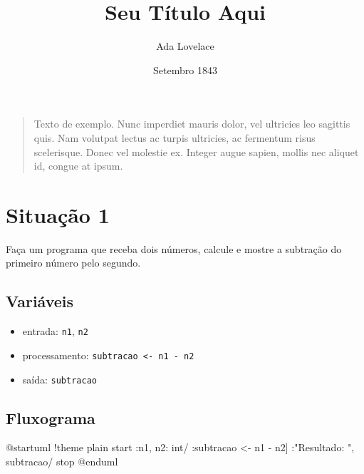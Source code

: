 \documentclass[12pt,a4paper]{article}
\title{Seu Título Aqui}
\author{Ada Lovelace}
\date{Setembro 1843}
\begin{document}

\maketitle %

\begin{quote}
Texto de exemplo. Nunc imperdiet mauris dolor, vel ultricies leo sagittis quis. Nam volutpat lectus ac turpis ultricies, ac fermentum risus scelerisque. Donec vel molestie ex. Integer augue sapien, mollis nec aliquet id, congue at ipsum.
\end{quote}

\begin{minipage}{\textwidth}
\section*{Situação 1}

Faça um programa que receba dois números, calcule e mostre a subtração do primeiro número pelo segundo.

\subsection*{Variáveis}
\begin{itemize}
    \item entrada: \verb|n1|, \verb|n2|
    \item processamento: \verb|subtracao <- n1 - n2|
    \item saída: \verb|subtracao|
\end{itemize}

\subsection*{Fluxograma}


\begin{plantuml}
    @startuml
    !theme plain
    start
    :n1, n2: int/
    :subtracao <- n1 - n2]
    :"Resultado: ", subtracao/
    stop
    @enduml
\end{plantuml}


\end{minipage}
\end{document}

